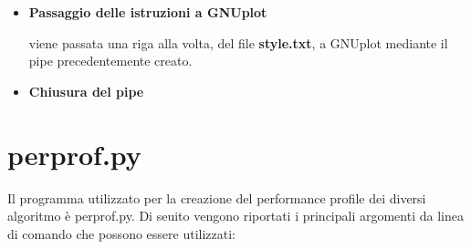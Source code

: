 \begin{center}
\begin{center}
\begin{itemize}
{}
\item{\textbf{Passaggio delle istruzioni a GNUplot}

viene passata una riga alla volta, del file \textbf{style.txt}, a GNUplot mediante il pipe precedentemente creato.
}
\item{\textbf{Chiusura del pipe}

}
\end{itemize}

\section{perprof.py}\label{perf_profile_py}
Il programma utilizzato per la creazione del performance profile dei diversi algoritmo è perprof.py\cite{salvagnin_perf}. Di seuito vengono riportati i principali argomenti da linea di comando che possono essere utilizzati:


\end{center}
\end{center}
